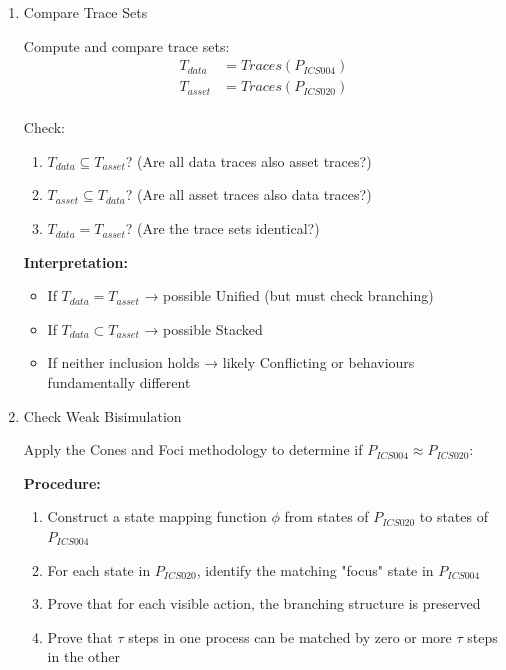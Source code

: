 \begin{enumerate}
\item
  Compare Trace Sets

  Compute and compare trace sets: \[
  \begin{aligned}
  T_{data} &= Traces(P_{ICS004}) \\
  T_{asset} &= Traces(P_{ICS020}) \\
  \end{aligned}
  \]

  Check:

  \begin{enumerate}
      \item \(T_{data} \subseteq T_{asset}\)? (Are all data traces also asset traces?)
      \item \(T_{asset} \subseteq T_{data}\)? (Are all asset traces also data traces?)
      \item \(T_{data} = T_{asset}\)? (Are the trace sets identical?)
  \end{enumerate}

  \textbf{Interpretation:}

  \begin{itemize}
      \item If \(T_{data} = T_{asset}\) → possible Unified (but must check branching)
      \item If \(T_{data} \subset T_{asset}\) → possible Stacked
      \item If neither inclusion holds → likely Conflicting or behaviours fundamentally different
  \end{itemize}
\item
  Check Weak Bisimulation

  Apply the Cones and Foci methodology \cite{Fokkink2004} to determine
  if \(P_{ICS004} \approx P_{ICS020}\):

  \textbf{Procedure:}

  \begin{enumerate}
      \item Construct a state mapping function \(\phi\) from states of \(P_{ICS020}\) to states of \(P_{ICS004}\)
      \item For each state in \(P_{ICS020}\), identify the matching "focus" state in \(P_{ICS004}\)
      \item Prove that for each visible action, the branching structure is preserved
      \item Prove that \(\tau\) steps in one process can be matched by zero or more \(\tau\) steps in the other
  \end{enumerate}


\end{enumerate}
